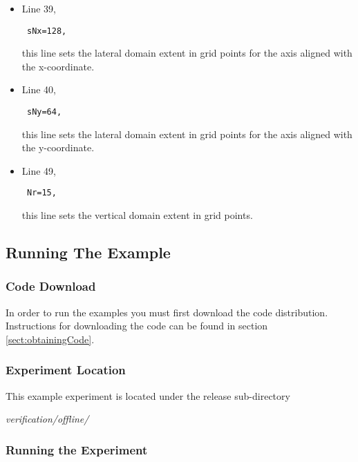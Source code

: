 \begin{itemize}

\item Line 39, 
\begin{verbatim} sNx=128, \end{verbatim} \noindent this line sets
the lateral domain extent in grid points for the
axis aligned with the x-coordinate.

\item Line 40, 
\begin{verbatim} sNy=64, \end{verbatim} 
\noindent this line sets
the lateral domain extent in grid points for the
axis aligned with the y-coordinate.

\item Line 49, 
\begin{verbatim} Nr=15,   \end{verbatim} 
\noindent this line sets
the vertical domain extent in grid points.

\end{itemize}


\subsection{Running The Example}
\label{www:tutorials}
\label{SEC:running_the_example}

\subsubsection{Code Download}
\label{www:tutorials}

In order to run the examples you must first download the code
distribution.  Instructions for downloading the code can be found in
section \ref{sect:obtainingCode}.

\subsubsection{Experiment Location}
\label{www:tutorials}

This example experiment is located under the release sub-directory

\vspace{5mm}
{\it verification/offline/ }

\subsubsection{Running the Experiment}
\label{www:tutorials}

